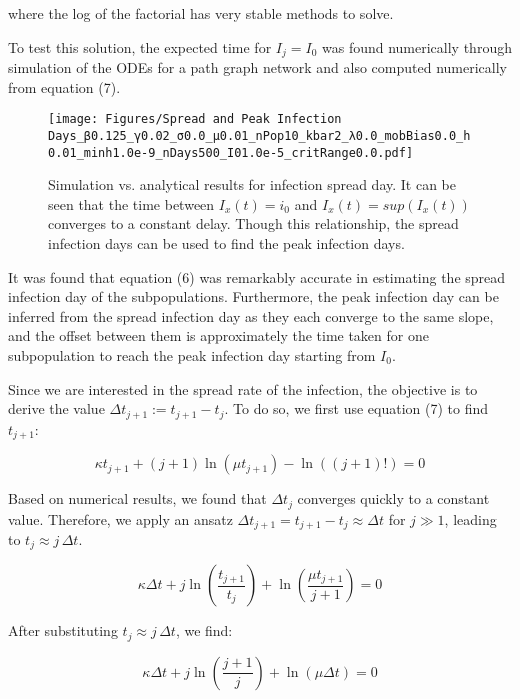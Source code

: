 where the log of the factorial has very stable methods to solve\cite{C}.

To test this solution, the expected time for $I_j = I_0$ was found numerically through simulation of the ODEs for a path graph network and also computed numerically from equation (7).

\begin{figure}[!ht]
    \centering
    \texttt{[image: Figures/Spread and Peak Infection Days\_β0.125\_γ0.02\_σ0.0\_μ0.01\_nPop10\_kbar2\_λ0.0\_mobBias0.0\_h0.01\_minh1.0e-9\_nDays500\_I01.0e-5\_critRange0.0.pdf]}
    \caption{\small Simulation vs. analytical results for infection spread day. It can be seen that the time between $I_x(t)=i_0$ and $I_x(t)=sup(I_x(t))$ converges to a constant delay. Though this relationship, the spread infection days can be used to find the peak infection days.}
\end{figure}

It was found that equation (6) was remarkably accurate in estimating the spread infection day of the subpopulations. Furthermore, the peak infection day can be inferred from the spread infection day as they each converge to the same slope, and the offset between them is approximately the time taken for one subpopulation to reach the peak infection day starting from $I_0$.

Since we are interested in the spread rate of the infection, the objective is to derive the value ${\Delta t}_{j+1} := t_{j+1}-t_j$. To do so, we first use equation (7) to find $t_{j+1}$:

\begin{equation}
\kappa t_{j+1} + (j+1) \ln(\mu t_{j+1}) - \ln((j+1)!) = 0 
\end{equation}

Based on numerical results, we found that ${\Delta t}_{j}$ converges quickly to a constant value. Therefore, we apply an ansatz ${\Delta t}_{j+1} = t_{j+1} - t_j \approx {\Delta t}$ for $j \gg 1$, leading to $t_j \approx j \, \Delta t$.

\begin{equation}
\kappa \Delta t + j \ln\left( \frac{t_{j+1}}{t_j} \right) + \ln\left( \frac{\mu t_{j+1}}{j+1} \right) = 0
\end{equation}

After substituting $t_j \approx j \, \Delta t$, we find:

\begin{equation}
\kappa \Delta t + j \ln\left( \frac{j+1}{j} \right) + \ln\left( \mu \Delta t \right) = 0 
\end{equation}


